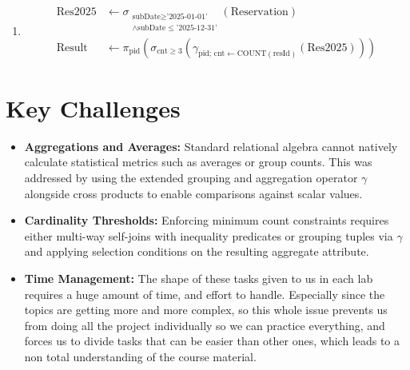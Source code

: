 \documentclass[11pt,a4paper]{article}
\begin{document}
\begin{enumerate}
    \item[\textbf{15.}] 
    \[
    \begin{aligned}
    \text{Res2025} &\leftarrow \sigma_{\substack{\text{subDate} \ge \text{'2025-01-01'} \\ \wedge \text{subDate} \le \text{'2025-12-31'}}}(\text{Reservation}) \\
    \text{Result} &\leftarrow \pi_{\text{pid}}\left(\sigma_{\text{cnt} \ge 3}\left(\gamma_{\text{pid};\, \text{cnt} \leftarrow \text{COUNT}(\text{resId})}(\text{Res2025})\right)\right)
    \end{aligned}
    \]
\end{enumerate}

\section*{Key Challenges}

\begin{itemize}
    \item \textbf{Aggregations and Averages:} Standard relational algebra cannot natively calculate statistical metrics such as averages or group counts. This was addressed by using the extended grouping and aggregation operator $\gamma$ alongside cross products to enable comparisons against scalar values.
    \item \textbf{Cardinality Thresholds:} Enforcing minimum count constraints requires either multi-way self-joins with inequality predicates or grouping tuples via $\gamma$ and applying selection conditions on the resulting aggregate attribute.
    \item \textbf{Time Management:} The shape of these tasks given to us in each lab requires a huge amount of time, and effort to handle. Especially since the topics are getting more and more complex, so this whole issue prevents us from doing all the project individually so we can practice everything, and forces us to divide tasks that can be easier than other ones, which leads to a non total understanding  of the course material.
    
\end{itemize}
\end{document}
